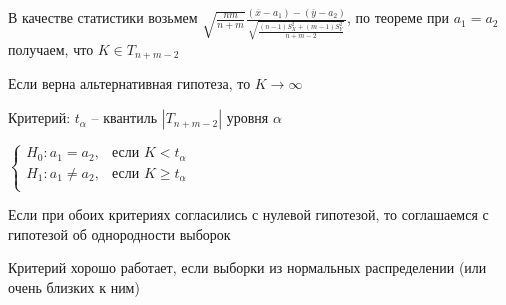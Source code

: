 \begin{enumerate}[label*=\Roman*. ]
    В качестве статистики возьмем $\sqrt{\frac{nm}{n + m}} \frac{(\overline x - a_1) - (\overline y - a_2)}{\sqrt{\frac{(n - 1) S_X^2 + (m - 1) S^2_Y}{n + m - 2}}}$, 
    по теореме при $a_1 = a_2$ получаем, что $K \in T_{n + m - 2}$

    Если верна альтернативная гипотеза, то $K \longrightarrow \infty$

    Критерий: $t_\alpha$ -- квантиль $|T_{n + m - 2}|$ уровня $\alpha$

    $\begin{cases}
        H_0 : a_1 = a_2, & \text{если } K < t_\alpha \\
        H_1 : a_1 \neq a_2, & \text{если } K \geq t_\alpha \\
    \end{cases}$

    \Nota Если при обоих критериях согласились с нулевой гипотезой, то соглашаемся с гипотезой об однородности выборок

    \Notas Критерий хорошо работает, если выборки из нормальных распределении (или очень близких к ним)

\end{enumerate}

